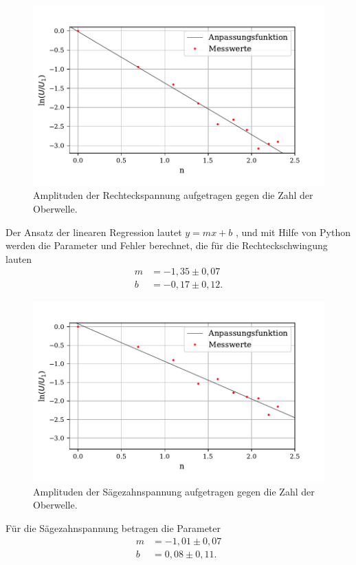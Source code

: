 \begin{figure}
  \centering
  \includegraphics{plot1.pdf}
  \caption{Amplituden der Rechteckspannung aufgetragen gegen die Zahl der Oberwelle.}
  \label{fig:rechteck}
\end{figure}
\noindent Der Ansatz der linearen Regression lautet $y = mx + b$ , und mit Hilfe von Python werden die Parameter und Fehler berechnet, die für die Rechteckschwingung lauten
\begin{align*}
  m &= -1,35 \pm 0,07 \\
  b &= -0,17 \pm 0,12 .
\end{align*}

\begin{figure}
  \centering
  \includegraphics{plot2.pdf}
  \caption{Amplituden der Sägezahnspannung aufgetragen gegen die Zahl der Oberwelle.}
  \label{fig:rechteck}
\end{figure}
Für die Sägezahnspannung betragen die Parameter
\begin{align*}
  m &= -1,01 \pm 0,07 \\
  b &= 0,08 \pm 0,11 .
\end{align*}

